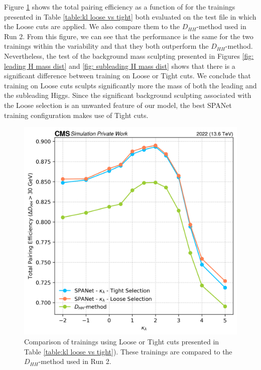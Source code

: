 Figure \ref{fig: loose vd tight} shows the total pairing efficiency as a function of \kl for the trainings presented in Table \ref{table:kl loose vs tight} both evaluated on the test file in which the Loose cuts are applied. We also compare them to the $D_{HH}$-method used in Run 2. From this figure, we can see that the performance is the same for the two trainings within the variability and that they both outperform the $D_{HH}$-method. Nevertheless, the test of the background mass sculpting presented in Figures \ref{fig: leading H mass dist} and \ref{fig: subleading H mass dist} shows that there is a significant difference between training on Loose or Tight cuts. We conclude that training on Loose cuts sculpts significantly more the mass of both the leading and the subleading Higgs. Since the significant background sculpting associated with the Loose selection is an unwanted feature of our model, the best SPANet training configuration makes use of Tight cuts.

\begin{figure}[hbt]
    \centering
    \includegraphics[width=0.6\linewidth]{Images/6.Improving/kappa lambda/loose vs tight.png}
    \caption{Comparison of trainings using Loose or Tight cuts presented in Table \ref{table:kl loose vs tight}). These trainings are compared to the $D_{HH}$-method used in Run 2.}
    \label{fig: loose vd tight}
\end{figure}

